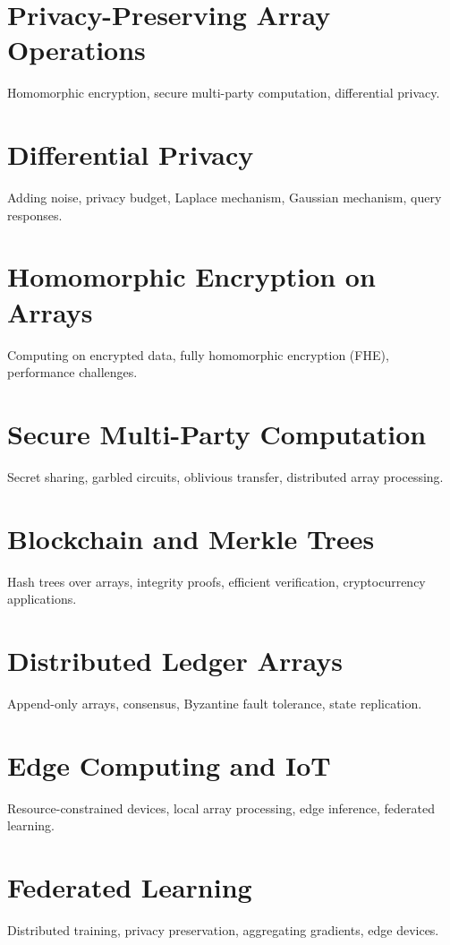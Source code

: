 
\chapter{Privacy-Preserving Array Operations}
Homomorphic encryption, secure multi-party computation, differential privacy.

\chapter{Differential Privacy}
Adding noise, privacy budget, Laplace mechanism, Gaussian mechanism, query responses.

\chapter{Homomorphic Encryption on Arrays}
Computing on encrypted data, fully homomorphic encryption (FHE), performance challenges.

\chapter{Secure Multi-Party Computation}
Secret sharing, garbled circuits, oblivious transfer, distributed array processing.

\chapter{Blockchain and Merkle Trees}
Hash trees over arrays, integrity proofs, efficient verification, cryptocurrency applications.

\chapter{Distributed Ledger Arrays}
Append-only arrays, consensus, Byzantine fault tolerance, state replication.


\chapter{Edge Computing and IoT}
Resource-constrained devices, local array processing, edge inference, federated learning.

\chapter{Federated Learning}
Distributed training, privacy preservation, aggregating gradients, edge devices.

